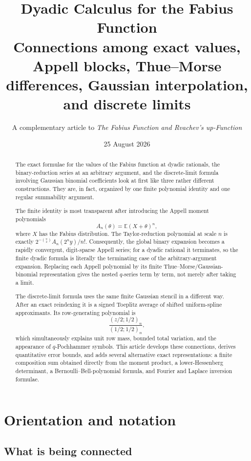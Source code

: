 \documentclass[11pt,oneside]{article}
\title{\bfseries Dyadic Calculus for the Fabius Function\\[0.35em]
\Large Connections among exact values, Appell blocks, Thue--Morse differences, Gaussian interpolation, and discrete limits}
\author{A complementary article to \emph{The Fabius Function and Rvachev's up-Function}}
\date{25 August 2026}
\theoremstyle{definition}
\theoremstyle{remark}
\newcommand{\E}{\mathbb E}
\newcommand{\poch}[3]{\left(#1;#2\right)_{#3}}
\begin{document}
\maketitle

\begin{abstract}
The exact formulae for the values of the Fabius function at dyadic rationals,
the binary-reduction series at an arbitrary argument, and the discrete-limit
formula involving Gaussian binomial coefficients look at first like three
rather different constructions.  They are, in fact, organized by one finite
polynomial identity and one regular summability argument.

The finite identity is most transparent after introducing the Appell moment
polynomials
\[
  A_n(\theta)=\E (X+\theta)^n,
\]
where $X$ has the Fabius distribution.  The Taylor-reduction polynomial at
scale $n$ is exactly $2^{-\binom n2}A_n(2^n y)/n!$.  Consequently, the global
binary expansion becomes a rapidly convergent, digit-sparse Appell series;
for a dyadic rational it terminates, so the finite dyadic formula is literally
the terminating case of the arbitrary-argument expansion.  Replacing each
Appell polynomial by its finite Thue--Morse/Gaussian-binomial representation
gives the nested $q$-series term by term, not merely after taking a limit.

The discrete-limit formula uses the same finite Gaussian stencil in a different
way.  After an exact reindexing it is a signed Toeplitz average of shifted
uniform-spline approximants.  Its row-generating polynomial is
\[
  \frac{\poch{z/2}{1/2}{n}}{\poch{1/2}{1/2}{n}},
\]
which simultaneously explains unit row mass, bounded total variation, and the
appearance of $q$-Pochhammer symbols.  This article develops these connections,
derives quantitative error bounds, and adds several alternative exact
representations: a finite composition sum obtained directly from the moment
product, a lower-Hessenberg determinant, a Bernoulli--Bell-polynomial formula,
and Fourier and Laplace inversion formulae.
\end{abstract}

\tableofcontents

\section{Orientation and notation}

\subsection{What is being connected}
\end{document}
